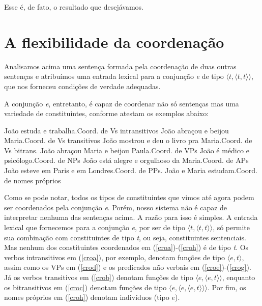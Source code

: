 \n Esse é, de fato, o resultado que desejávamos.

\section{A flexibilidade da coordenação}

Analisamos acima uma senten\-ça formada pela coordena\-ção de duas
outras senten\-ças e atribuímos uma entrada lexical para a
conjun\-ção \textit{e} de tipo $\langle t,\langle t,t\rangle\rangle$, que
nos forneceu condi\-çõ\-es de verdade adequadas.

A conjun\-ção \textit{e}, entretanto, é capaz de coordenar não só
senten\-ças mas uma variedade de constituintes, conforme atestam
os exemplos abaixo:

\begin{exe}
\ex\label{cro}
\begin{xlist}
\ex João estuda e trabalha.\hfill Coord. de  Vs intransitivos\label{croa}
\ex João abraçou e beijou Maria.\hfill Coord. de  Vs transitivos\label{crob}
\ex João mostrou e deu o livro pra Maria.\hfill Coord. de Vs bitrans.\label{croc}
\ex João abraçou Maria e beijou Paula.\hfill Coord. de  VPs\label{crod}
\ex João é médico e psicólogo.\hfill Coord. de NPs \label{croe}
\ex João está alegre e orgulhoso da Maria.\hfill Coord. de
APs\label{crof}
\ex João esteve em Paris e em Londres.\hfill Coord. de
PPs.\label{crog}
\ex João e Maria estudam.\hfill Coord. de nomes próprios\label{croh}

\end{xlist}
\end{exe}

\n Como se pode notar, todos os tipos de constituintes que vimos
até agora podem ser coordenados pela conjun\-ção \textit{e}. Porém,
nosso sistema não é capaz de interpretar nenhuma das senten\-ças
acima. A razão para isso é simples. A entrada lexical que
fornecemos para a conjun\-ção \textit{e}, por ser de tipo $\langle
t,\langle t,t\rangle\rangle$, só permite sua combina\-ção com
constituintes de tipo \textit{t}, ou seja, constituintes
sentenciais. Mas nenhum dos constituintes coordenados em
(\ref{croa})-(\ref{croh}) é de tipo \textit{t}. Os verbos
intransitivos em (\ref{croa}), por exemplo, denotam fun\-çõ\-es de
tipo $\langle e,t\rangle$, assim como os VPs em (\ref{crod}) e os
predicados não verbais em (\ref{croe})-(\ref{crog}). Já os verbos
transitivos em (\ref{crob}) denotam fun\-çõ\-es de tipo $\langle
e,\langle e,t\rangle\rangle$, enquanto os bitransitivos em
(\ref{croc}) denotam fun\-çõ\-es de tipo $\langle e,\langle e,
\langle e,t\rangle\rangle\rangle$. Por fim, os nomes próprios em
(\ref{croh}) denotam indivíduos (tipo $e$).

